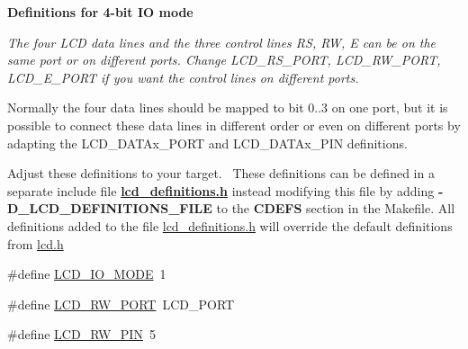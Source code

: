 \begin{Indent}{\bf Definitions for 4-\/bit IO mode}\par
{\em The four L\+CD data lines and the three control lines RS, RW, E can be on the same port or on different ports. Change L\+C\+D\+\_\+\+R\+S\+\_\+\+P\+O\+RT, L\+C\+D\+\_\+\+R\+W\+\_\+\+P\+O\+RT, L\+C\+D\+\_\+\+E\+\_\+\+P\+O\+RT if you want the control lines on different ports.

Normally the four data lines should be mapped to bit 0..3 on one port, but it is possible to connect these data lines in different order or even on different ports by adapting the L\+C\+D\+\_\+\+D\+A\+T\+Ax\+\_\+\+P\+O\+RT and L\+C\+D\+\_\+\+D\+A\+T\+Ax\+\_\+\+P\+IN definitions.

Adjust these definitions to your target.~\newline
These definitions can be defined in a separate include file {\bfseries \hyperlink{a00003_source}{lcd\+\_\+definitions.\+h}} instead modifying this file by adding {\bfseries -\/\+D\+\_\+\+L\+C\+D\+\_\+\+D\+E\+F\+I\+N\+I\+T\+I\+O\+N\+S\+\_\+\+F\+I\+LE} to the {\bfseries C\+D\+E\+FS} section in the Makefile. All definitions added to the file \hyperlink{a00003_source}{lcd\+\_\+definitions.\+h} will override the default definitions from \hyperlink{a00002}{lcd.\+h} }\begin{DoxyCompactItemize}
\item 
\#define \hyperlink{a00006_ga659fcdf979f69bbd14f852f525f25e02}{L\+C\+D\+\_\+\+I\+O\+\_\+\+M\+O\+DE}~1
\item 
\#define \hyperlink{a00006_gae8772bdf31db863b81805c837bdc2da2}{L\+C\+D\+\_\+\+R\+W\+\_\+\+P\+O\+RT}~L\+C\+D\+\_\+\+P\+O\+RT
\item 
\#define \hyperlink{a00006_ga3ac938dd5fc02a9a232df6605b5f6aa8}{L\+C\+D\+\_\+\+R\+W\+\_\+\+P\+IN}~5
\end{DoxyCompactItemize}
\end{Indent}
